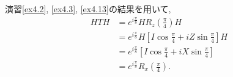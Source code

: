 \begin{ex}
    \label{ex4.14}
    演習\ref{ex4.2}, \ref{ex4.3}, \ref{ex4.13}の結果を用いて,
    \begin{align*}
        HTH
         & =
        e^{i \frac{\pi}{8}}HR_z\left( \frac{\pi}{4}\right) H   \\
         & =
        e^{i \frac{\pi}{8}}H
        \left[
            I  \cos\frac{\pi}{4} + i Z \sin\frac{\pi}{4}
            \right] H
        \\
         & =
        e^{i \frac{\pi}{8}}
        \left[
            I  \cos\frac{\pi}{4} + i X \sin\frac{\pi}{4}
            \right]
        \\
         & =e^{i \frac{\pi}{8}}R_x\left( \frac{\pi}{4}\right).
    \end{align*}
\end{ex}

